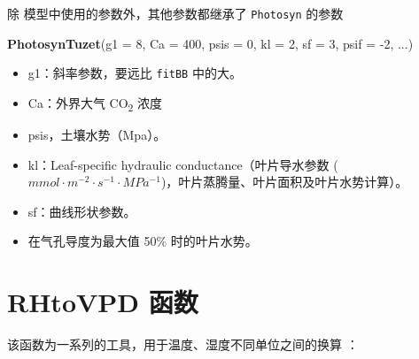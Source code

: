 \documentclass[
]{krantz}
\makeatletter
\newenvironment{Shaded}{\begin{snugshade}}{\end{snugshade}}
\newcommand{\DataTypeTok}[1]{\textcolor[rgb]{0.13,0.29,0.53}{#1}}
\newcommand{\DecValTok}[1]{\textcolor[rgb]{0.00,0.00,0.81}{#1}}
\newcommand{\KeywordTok}[1]{\textcolor[rgb]{0.13,0.29,0.53}{\textbf{#1}}}
\newcommand{\NormalTok}[1]{#1}
\providecommand{\tightlist}{%
  \setlength{\itemsep}{0pt}\setlength{\parskip}{0pt}}
\newenvironment{kframe}{%
\medskip{}
\setlength{\fboxsep}{.8em}
 \def\at@end@of@kframe{}%
 \ifinner\ifhmode%
  \def\at@end@of@kframe{\end{minipage}}%
  \begin{minipage}{\columnwidth}%
 \fi\fi%
 \def\FrameCommand##1{\hskip\@totalleftmargin \hskip-\fboxsep
 \colorbox{shadecolor}{##1}\hskip-\fboxsep
     \hskip-\linewidth \hskip-\@totalleftmargin \hskip\columnwidth}%
 \MakeFramed {\advance\hsize-\width
   \@totalleftmargin\z@ \linewidth\hsize
   \@setminipage}}%
 {\par\unskip\endMakeFramed%
 \at@end@of@kframe}
\renewenvironment{Shaded}{\begin{kframe}}{\end{kframe}}
\makeatother
\begin{document}
除 \citet{tuzet2003a} 模型中使用的参数外，其他参数都继承了 \texttt{Photosyn} 的参数

\begin{Shaded}
\begin{Highlighting}[]
\KeywordTok{PhotosynTuzet}\NormalTok{(}\DataTypeTok{g1 =} \DecValTok{8}\NormalTok{, }\DataTypeTok{Ca =} \DecValTok{400}\NormalTok{, }\DataTypeTok{psis =} \DecValTok{0}\NormalTok{,}
              \DataTypeTok{kl =} \DecValTok{2}\NormalTok{, }\DataTypeTok{sf =} \DecValTok{3}\NormalTok{, }\DataTypeTok{psif =} \DecValTok{{-}2}\NormalTok{,}
\NormalTok{...)}
\end{Highlighting}
\end{Shaded}

\begin{itemize}
\tightlist
\item
  g1：斜率参数，要远比 \texttt{fitBB} 中的大。
\item
  Ca：外界大气 CO\textsubscript{2} 浓度
\item
  psis，土壤水势（Mpa）。
\item
  kl：Leaf-speciﬁc hydraulic conductance（叶片导水参数 (\(mmol \cdot m^{-2} \cdot s^{-1} \cdot MPa^{-1}\))，叶片蒸腾量、叶片面积及叶片水势计算）。
\item
  sf：曲线形状参数。
\item
  在气孔导度为最大值 50\% 时的叶片水势。
\end{itemize}

\cleardoublepage

\hypertarget{rhtovpd}{%
\chapter{RHtoVPD 函数}\label{rhtovpd}}

该函数为一系列的工具，用于温度、湿度不同单位之间的换算 \citet{Jones1993Plants} ：
\end{document}
